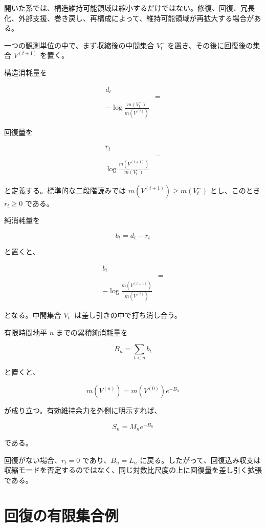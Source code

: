 \documentclass[12pt,a4paper]{article}
\begin{document}
開いた系では、構造維持可能領域は縮小するだけではない。修復、回復、冗長化、外部支援、巻き戻し、再構成によって、維持可能領域が再拡大する場合がある。

一つの観測単位の中で、まず収縮後の中間集合 \(V_{t}^-\) を置き、その後に回復後の集合 \(V^{(t+1)}\) を置く。

構造消耗量を

\[
\begin{aligned}
d_{t} \\
&= \\
-\log\frac{m(V_{t}^-)}{m(V^{(t)})}
\end{aligned}
\]

回復量を

\[
\begin{aligned}
r_{t} \\
&= \\
\log\frac{m(V^{(t+1)})}{m(V_{t}^-)}
\end{aligned}
\]

と定義する。標準的な二段階読みでは \(m(V^{(t+1)})\ge m(V_{t}^-)\) とし、このとき \(r_{t}\ge0\) である。

純消耗量を

\[
b_{t}=d_{t}-r_{t}
\]

と置くと、

\[
\begin{aligned}
b_{t} \\
&= \\
-\log\frac{m(V^{(t+1)})}{m(V^{(t)})}
\end{aligned}
\]

となる。中間集合 \(V_{t}^-\) は差し引きの中で打ち消し合う。

有限時間地平 \(n\) までの累積純消耗量を

\[
B_{n}=\sum_{t<n}b_{t}
\]

と置くと、

\[
m(V^{(n)})=m(V^{(0)})e^{-B_{n}}
\]

が成り立つ。有効維持余力を外側に明示すれば、

\[
S_{n}=M_{n} e^{-B_{n}}
\]

である。

回復がない場合、\(r_{t}=0\) であり、\(B_{n}=L_{n}\) に戻る。したがって、回復込み収支は収縮モードを否定するのではなく、同じ対数比尺度の上に回復量を差し引く拡張である。

\section{回復の有限集合例}\label{ux56deux5fa9ux306eux6709ux9650ux96c6ux5408ux4f8b}
\end{document}
